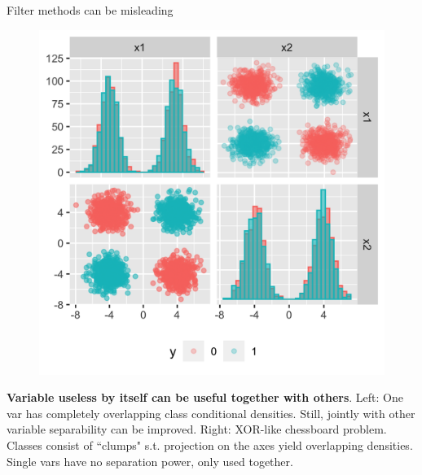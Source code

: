 \documentclass[11pt,compress,t,notes=noshow, xcolor=table]{beamer}
\begin{document}
\begin{vbframe}{Filter methods can be misleading}
\begin{figure}
\begin{minipage}{0.45\textwidth}
        \includegraphics[width=\textwidth]{figure/guyon_example_xor.png} %
    \end{minipage}
    \end{figure}
\vspace{0.3cm}
\footnotesize{\textbf{Variable useless by itself can be useful together with others}. Left: One var has completely overlapping class conditional densities. Still, jointly with other variable separability can be improved. Right: XOR-like chessboard problem. Classes consist of ``clumps" s.t. projection on the axes yield overlapping densities. Single vars have no separation power, only used together.}


\end{vbframe}
\end{document}
